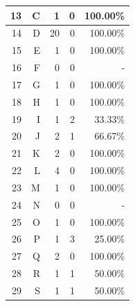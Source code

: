\begin{longtable}[c]{|r|r|r|r|r|}
	13           & C                 & 1                       & 0                       &100.00\%            \\ \hline
	14           & D                 & 20                       & 0                       &100.00\%            \\ \hline
	15           & E                 & 1                       & 0                       &100.00\%            \\ \hline
	16           & F                 & 0                       & 0                       & -            \\ \hline
	17           & G                 & 1                       & 0                       &100.00\%            \\ \hline
	18           & H                 & 1                       & 0                       &100.00\%            \\ \hline
	19           & I                 & 1                       & 2                       &33.33\%            \\ \hline
	20           & J                 & 2                       & 1                       &66.67\%            \\ \hline
	21           & K                 & 2                       & 0                       &100.00\%            \\ \hline
	22           & L                 & 4                       & 0                       &100.00\%            \\ \hline
	23           & M                 & 1                       & 0                       &100.00\%            \\ \hline
	24           & N                 & 0                       & 0                       & -            \\ \hline
	25           & O                 & 1                       & 0                       &100.00\%            \\ \hline
	26           & P                 & 1                       & 3                       &25.00\%            \\ \hline
	27           & Q                 & 2                       & 0                       &100.00\%            \\ \hline
	28           & R                 & 1                       & 1                       &50.00\%            \\ \hline
	29           & S                 & 1                       & 1                       &50.00\%            \\ \hline

\end{longtable}
